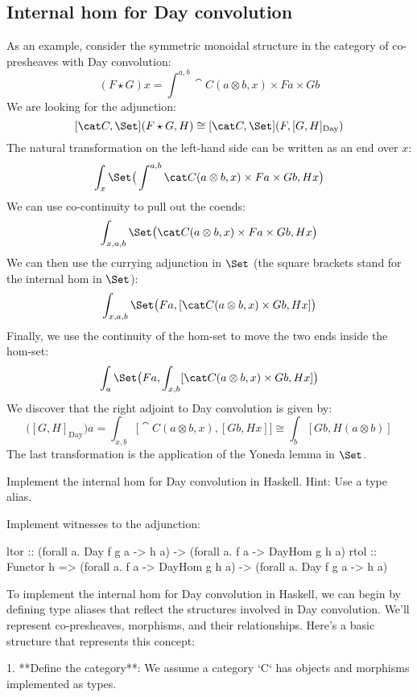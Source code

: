 \documentclass[DaoFP]{subfiles}
\begin{document}
\subsection{Internal hom for Day convolution}

As an example, consider the symmetric monoidal structure in the category of co-presheaves with Day convolution:
\[ (F \star G) x = \int^{a, b} \cat C (a \otimes b, x) \times F a \times G b \]
We are looking for the adjunction:
\[ [\cat C, \Set] (F \star G, H) \cong  [\cat C, \Set] (F, [G, H]_{\text{Day}}) \]
The natural transformation on the left-hand side can be written as an end over $x$:
\[ \int_x \Set \big( \int^{a, b} \cat C (a \otimes b, x) \times F a \times G b, H x \big) \]
We can use co-continuity to pull out the coends:
\[ \int_{x, a, b} \Set \big( \cat C (a \otimes b, x) \times F a \times G b, H x \big) \]
We can then use the currying adjunction in $\Set$ (the square brackets stand for the internal hom in $\Set$):
\[ \int_{x, a, b} \Set \big( F a, [\cat C (a \otimes b, x)  \times G b, H x] \big) \]
Finally, we use the continuity of the hom-set to move the two ends inside the hom-set:
\[ \int_{a} \Set \big( F a, \int_{x, b} [\cat C (a \otimes b, x)  \times G b, H x] \big) \]
We discover that the right adjoint to Day convolution is given by:
\[ \big([G, H]_{\text{Day}}\big) a = \int_{x, b} \big[\cat C(a \otimes b, x), [G b, H x]\big] \cong \int_b [G b, H (a \otimes b)]\]
The last transformation is the application of the Yoneda lemma in $\Set$.
\begin{exercise}
Implement the internal hom for Day convolution in Haskell. Hint: Use a type alias.
\end{exercise}
\begin{exercise}
Implement witnesses to the adjunction:
\begin{haskell}
ltor :: (forall a. Day f g a -> h a) -> (forall a. f a -> DayHom g h a)
rtol :: Functor h => 
  (forall a. f a -> DayHom g h a) -> (forall a. Day f g a -> h a)
\end{haskell}
\end{exercise}


To implement the internal hom for Day convolution in Haskell, we can begin by defining type aliases that reflect the structures involved in Day convolution. We'll represent co-presheaves, morphisms, and their relationships. Here's a basic structure that represents this concept:

1. **Define the category**: We assume a category `C` has objects and morphisms implemented as types.
\end{document}

